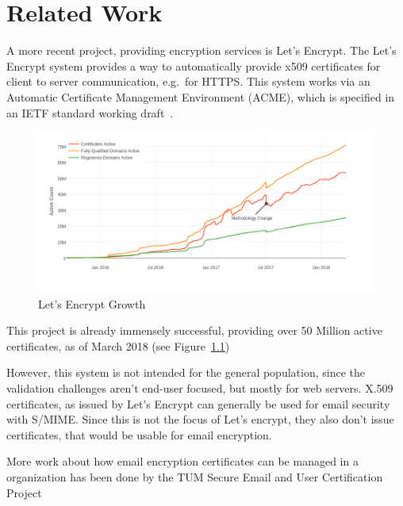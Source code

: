 \chapter{Related Work}\label{ch:relatedWork}

A more recent project, providing encryption services is Let's Encrypt.
The Let's Encrypt system provides a way to automatically provide x509 certificates for client to server communication,
e.g.\ for HTTPS\@.
This system works via an Automatic Certificate Management Environment (ACME), which is specified in an IETF standard
working draft~\cite{letsencrypteacme}.

\begin{figure}
    \centering
    \includegraphics[width=\textwidth]{figures/letsencryptusers.png}
    \caption{Let's Encrypt Growth~\cite{letsencryptstats}}
    \label{fig:letsencrypt}
\end{figure}

This project is already immensely successful, providing over 50 Million active certificates, as of March 2018 (see
Figure~\ref{fig:letsencrypt})

However, this system is not intended for the general population, since the validation challenges aren't end-user
focused, but mostly for web servers.
X.509 certificates, as issued by Let's Encrypt can generally be used for email security with S/MIME\@.
Since this is not the focus of Let's encrypt, they also don't issue certificates, that would be usable for email
encryption.

More work about how email encryption certificates can be managed in a organization has been done by the TUM Secure
Email and User Certification Project~\cite{hauner2016interoperability, jagdish2016certservice, straub2016directoryservice, maier2015multidevice}
